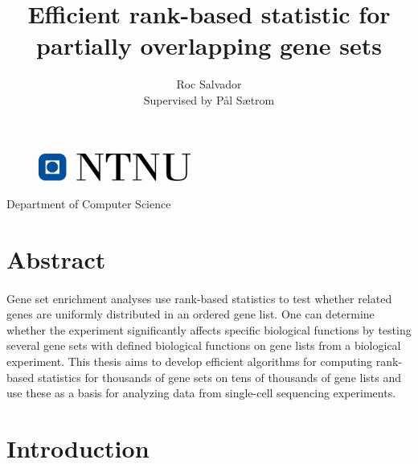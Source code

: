 \documentclass[12pt]{extarticle}
\begin{document}
\author{Roc Salvador \\ Supervised by Pål Sætrom}

\title{\bfseries Efficient rank-based statistic for partially overlapping gene sets}

\maketitle


\vspace{9cm}

\begin{figure}[H]
    \centering
    \includegraphics[width=5cm]{img/ntnu.png}
\end{figure}

\begin{center}

Department of Computer Science

\end{center}


\newpage

\tableofcontents

\newpage


\section{Abstract}

\paragraph{} Gene set enrichment analyses use rank-based statistics to test whether related genes are uniformly distributed in an ordered gene list. One can determine whether the experiment significantly affects specific biological functions by testing several gene sets with defined biological functions on gene lists from a biological experiment. This thesis aims to develop efficient algorithms for computing rank-based statistics for thousands of gene sets on tens of thousands of gene lists and use these as a basis for analyzing data from single-cell sequencing experiments. \cite{triumphs-limitattions-scRNA-seq} \cite{gsea}

\newpage

\section{Introduction}
\end{document}
